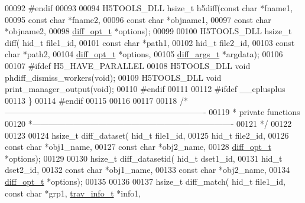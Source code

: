\begin{DoxyCode}
00092 \textcolor{preprocessor}{#endif}
00093 
00094 H5TOOLS\_DLL hsize\_t  h5diff(\textcolor{keyword}{const} \textcolor{keywordtype}{char} *fname1,
00095                 \textcolor{keyword}{const} \textcolor{keywordtype}{char} *fname2,
00096                 \textcolor{keyword}{const} \textcolor{keywordtype}{char} *objname1,
00097                 \textcolor{keyword}{const} \textcolor{keywordtype}{char} *objname2,
00098                 \hyperlink{structdiff__opt__t}{diff\_opt\_t} *options);
00099 
00100 H5TOOLS\_DLL hsize\_t diff( hid\_t      file1\_id,
00101               \textcolor{keyword}{const} \textcolor{keywordtype}{char} *path1,
00102               hid\_t      file2\_id,
00103               \textcolor{keyword}{const} \textcolor{keywordtype}{char} *path2,
00104               \hyperlink{structdiff__opt__t}{diff\_opt\_t} *options,
00105               \hyperlink{structdiff__args__t}{diff\_args\_t} *argdata);
00106 
00107 \textcolor{preprocessor}{#ifdef H5\_HAVE\_PARALLEL}
00108 H5TOOLS\_DLL \textcolor{keywordtype}{void} phdiff\_dismiss\_workers(\textcolor{keywordtype}{void});
00109 H5TOOLS\_DLL \textcolor{keywordtype}{void} print\_manager\_output(\textcolor{keywordtype}{void});
00110 \textcolor{preprocessor}{#endif}
00111 
00112 \textcolor{preprocessor}{#ifdef \_\_cplusplus}
00113 \}
00114 \textcolor{preprocessor}{#endif}
00115 
00116 
00117 
00118 \textcolor{comment}{/*-------------------------------------------------------------------------}
00119 \textcolor{comment}{ * private functions}
00120 \textcolor{comment}{ *-------------------------------------------------------------------------}
00121 \textcolor{comment}{ */}
00122 
00123 
00124 hsize\_t diff\_dataset( hid\_t file1\_id,
00125                       hid\_t file2\_id,
00126                       \textcolor{keyword}{const} \textcolor{keywordtype}{char} *obj1\_name,
00127                       \textcolor{keyword}{const} \textcolor{keywordtype}{char} *obj2\_name,
00128                       \hyperlink{structdiff__opt__t}{diff\_opt\_t} *options);
00129 
00130 hsize\_t diff\_datasetid( hid\_t dset1\_id,
00131                         hid\_t dset2\_id,
00132                         \textcolor{keyword}{const} \textcolor{keywordtype}{char} *obj1\_name,
00133                         \textcolor{keyword}{const} \textcolor{keywordtype}{char} *obj2\_name,
00134                         \hyperlink{structdiff__opt__t}{diff\_opt\_t} *options);
00135 
00136 
00137 hsize\_t diff\_match( hid\_t file1\_id, \textcolor{keyword}{const} \textcolor{keywordtype}{char} *grp1, \hyperlink{structtrav__info__t}{trav\_info\_t} *info1,

\end{DoxyCode}
